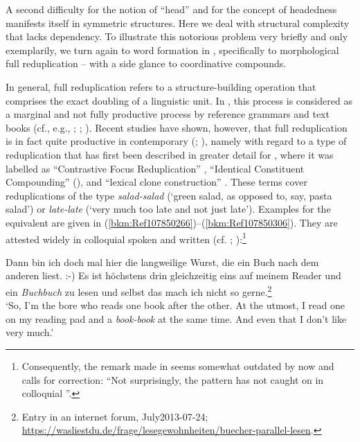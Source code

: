 \documentclass[output=paper
  ,nobabel
  ,draftmode
  ,colorlinks, citecolor=brown
]{langscibook}
\begin{document}
A second difficulty for the notion of ``head'' and for the concept of headedness manifests itself in
symmetric structures. Here we deal with structural complexity that lacks dependency. To illustrate
this notorious problem very briefly and only exemplarily, we turn again to word formation in ,
specifically to morphological full reduplication – with a side glance to coordinative compounds.

In general, full reduplication refers to a structure-building operation that comprises the exact
doubling of a linguistic unit. In , this process is considered as a marginal and not fully
productive process by reference grammars and text books (cf., e.g., \citealt[104]{OrtnerOrtner1984};
\citealt[43]{Lohde2006}; \citealt[94--96]{FleischerBarz2012}). Recent studies have shown, however,
that full reduplication is in fact quite productive in contemporary 
(\citealt{Finkbeiner2014}; \citealt{Freywald2015}), namely with regard to a type of reduplication
that has first been described in greater detail for , where it was labelled as ``Contrastive
Focus Reduplication'' \citep{GhomeshiEtAl2004}, ``Identical Constituent Compounding''
(\citealt{Hohenhaus1996,Hohenhaus2004}), and ``lexical clone construction'' \citep{Horn2018}. These terms
cover reduplications of the type \emph{salad-salad} (`green salad, as opposed to, say, pasta salad')
or \emph{late-late} (`very much too late and not just late'). Examples for the  equivalent are
given in (\ref{bkm:Ref107850266})–(\ref{bkm:Ref107850306}). They are attested widely in colloquial
spoken and written  (cf. \citealt{Finkbeiner2014};
\citealt{Freywald2015}):\footnote{Consequently, the remark made in 
  \citet[202]{StolzStrohUrdze2011} seems somewhat outdated by now and calls for correction: ``Not surprisingly,
  the pattern has not caught on in colloquial ''.}


\ea
\label{bkm:Ref107850266}%
       Dann bin ich doch mal hier die langweilige Wurst, die ein Buch nach dem anderen liest. :-) Es ist höchstens drin gleichzeitig eins auf meinem Reader und ein \emph{Buchbuch} zu lesen und selbst das mach ich nicht so gerne.\footnote{Entry in an internet forum, July2013-07-24; \url{https://wasliestdu.de/frage/lesegewohnheiten/buecher-parallel-lesen}.}\\
`So, I'm the bore who reads one book after the other. At the utmost, I read one on my reading pad and a \emph{book-book} at the same time. And even that I don't like very much.'
\z
\end{document}
